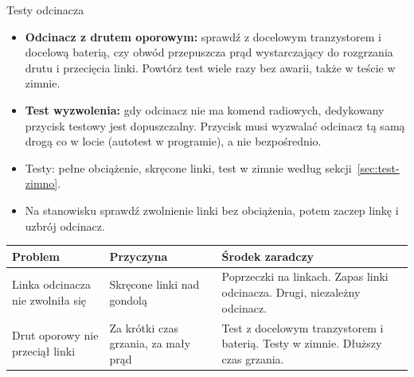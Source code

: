 \begin{podsekcja}{Testy odcinacza}
\begin{itemize}
  \item \textbf{Odcinacz z drutem oporowym:} sprawdź z docelowym tranzystorem i docelową baterią, czy obwód przepuszcza prąd wystarczający do rozgrzania drutu i przecięcia linki. Powtórz test wiele razy bez awarii, także w teście w zimnie.
  \item \textbf{Test wyzwolenia:} gdy odcinacz nie ma komend radiowych, dedykowany przycisk testowy jest dopuszczalny. Przycisk musi wyzwalać odcinacz tą samą drogą co w locie (autotest w programie), a nie bezpośrednio.
  \item Testy: pełne obciążenie, skręcone linki, test w zimnie według sekcji~\ref{sec:test-zimno}.
  \item Na stanowisku sprawdź zwolnienie linki bez obciążenia, potem zaczep linkę i uzbrój odcinacz.
\end{itemize}

\renewcommand{\arraystretch}{1.3}
\small
\begin{tabularx}{\linewidth}{@{}P{32mm}P{38mm}L@{}}
\toprule
\textbf{Problem} & \textbf{Przyczyna} & \textbf{Środek zaradczy}\\\midrule
Linka odcinacza nie zwolniła się & Skręcone linki nad gondolą & Poprzeczki na linkach. Zapas linki odcinacza. Drugi, niezależny odcinacz.\\
Drut oporowy nie przeciął linki & Za krótki czas grzania, za mały prąd & Test z docelowym tranzystorem i baterią. Testy w zimnie. Dłuższy czas grzania.\\
\bottomrule
\end{tabularx}
\normalsize
\end{podsekcja}

